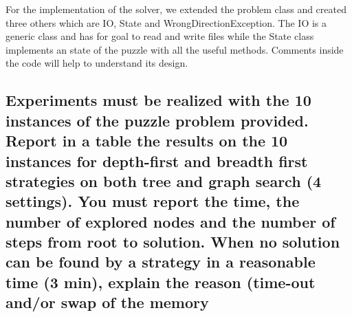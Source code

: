 \documentclass[a4paper,10pt]{article}
\begin{document}
	For the implementation of the solver, we extended the problem class and created three others which are IO, State and WrongDirectionException. The IO is a generic class and  has for goal to read and write files while the State class implements an state of the puzzle with all the useful methods. Comments inside the code will help to understand its design.
	
	\subsection{Experiments must be realized with the 10 instances of the puzzle problem provided. Report in a table the results on the 10 instances for depth-first and breadth first strategies on both tree and graph search (4 settings). You must report the time, the number of explored nodes and the number of steps from root to solution. When no solution can be found by a strategy in a reasonable time (3 min), explain the reason (time-out and/or swap of the memory}
	
\end{document}
